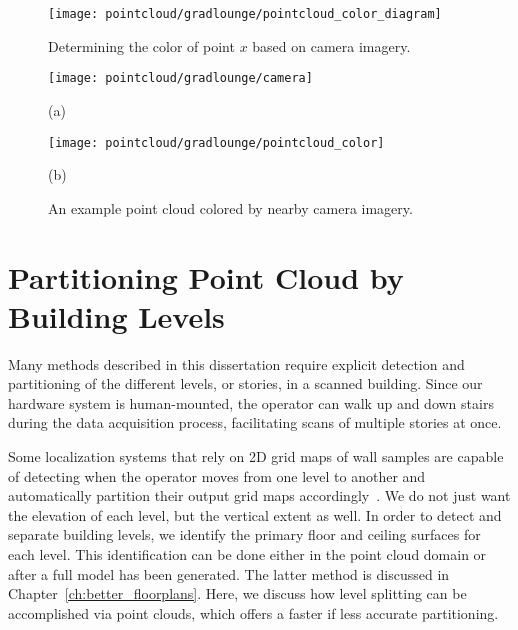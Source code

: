\documentclass[12pt,onecolumn,oneside]{book}
\begin{document}
\begin{figure}
	\centerline{\texttt{[image: pointcloud/gradlounge/pointcloud\_color\_diagram]}}
	\caption{Determining the color of point $x$ based on camera imagery.}
	\label{fig:pointcloud_color_diagram}
\end{figure}

\begin{figure}
	\begin{minipage}[t]{0.5\linewidth}
		\centerline{\texttt{[image: pointcloud/gradlounge/camera]}}
		\centerline{(a)}
	\end{minipage}
	\hfill
	\begin{minipage}[t]{0.5\linewidth}
		\centerline{\texttt{[image: pointcloud/gradlounge/pointcloud\_color]}}
		\centerline{(b)}
	\end{minipage}

	\caption{An example point cloud colored by nearby camera imagery.}
	\label{fig:pointcloud_color}
\end{figure}

\section{Partitioning Point Cloud by Building Levels}
\label{sec:pointcloud_level_split}

Many methods described in this dissertation require explicit detection and partitioning of the different levels, or stories, in a scanned building.  Since our hardware system is human-mounted, the operator can walk up and down stairs during the data acquisition process, facilitating scans of multiple stories at once.  

Some localization systems that rely on 2D grid maps of wall samples are capable of detecting when the operator moves from one level to another and automatically partition their output grid maps accordingly~\cite{MITBackpack}.  We do not just want the elevation of each level, but the vertical extent as well.  In order to detect and separate building levels, we identify the primary floor and ceiling surfaces for each level.  This identification can be done either in the point cloud domain or after a full model has been generated.  The latter method is discussed in Chapter~\ref{ch:better_floorplans}.  Here, we discuss how level splitting can be accomplished via point clouds, which offers a faster if less accurate partitioning.
\end{document}
